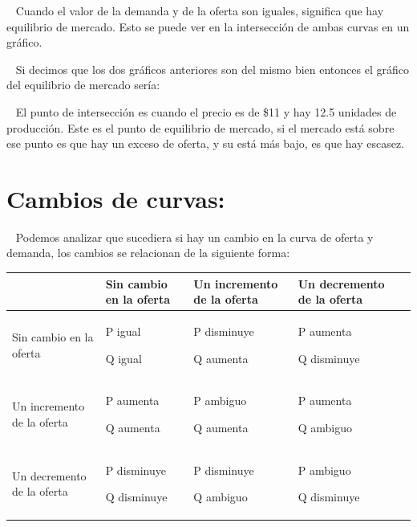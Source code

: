\documentclass[
  letterpaper,
  DIV=11,
  numbers=noendperiod]{scrreport}
\begin{document}
~ Cuando el valor de la demanda y de la oferta son iguales, significa
que hay equilibrio de mercado. Esto se puede ver en la intersección de
ambas curvas en un gráfico.

~ Si decimos que los dos gráficos anteriores son del mismo bien entonces
el gráfico del equilibrio de mercado sería:

\begin{center}
\end{center}

~ El punto de intersección es cuando el precio es de \$11 y hay 12.5
unidades de producción. Este es el punto de equilibrio de mercado, si el
mercado está sobre ese punto es que hay un exceso de oferta, y su está
más bajo, es que hay escasez.

\hypertarget{cambios-de-curvas}{%
\section{Cambios de curvas:}\label{cambios-de-curvas}}

~ Podemos analizar que sucediera si hay un cambio en la curva de oferta
y demanda, los cambios se relacionan de la siguiente forma:

\begin{table}[H]
    \centering
    \begin{tabular}{|p{25mm}|p{25mm}|p{25mm}|p{25mm}|p{25mm}|}
        \hline
         & Sin cambio en la oferta & Un incremento de la oferta & Un decremento de la oferta  \\ \hline
        Sin cambio en la oferta & P igual \par Q igual & P disminuye \par Q aumenta & P aumenta \par Q disminuye \\ \hline
        Un incremento de la oferta & P aumenta \par Q aumenta & P ambiguo \par Q aumenta & P aumenta \par Q ambiguo\\ \hline
        Un decremento de la oferta & P disminuye \par Q disminuye & P disminuye \par Q ambiguo & P ambiguo \par Q disminuye \\ \hline
    \end{tabular}
\end{table}
\end{document}
